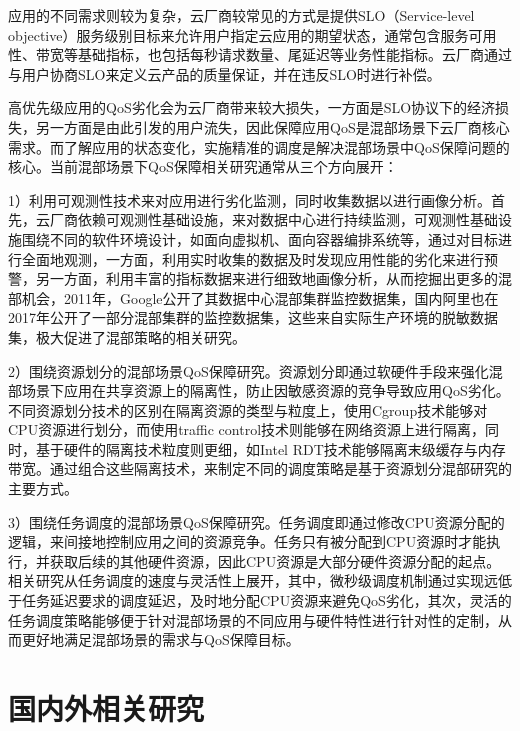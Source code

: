 应用的不同需求则较为复杂，云厂商较常见的方式是提供SLO（Service-level objective）服务级别目标来允许用户指定云应用的期望状态，通常包含服务可用性、带宽等基础指标，也包括每秒请求数量、尾延迟等业务性能指标。云厂商通过与用户协商SLO来定义云产品的质量保证，并在违反SLO时进行补偿。

高优先级应用的QoS劣化会为云厂商带来较大损失，一方面是SLO协议下的经济损失，另一方面是由此引发的用户流失，因此保障应用QoS是混部场景下云厂商核心需求。而了解应用的状态变化，实施精准的调度是解决混部场景中QoS保障问题的核心。当前混部场景下QoS保障相关研究通常从三个方向展开：

1）利用可观测性技术来对应用进行劣化监测，同时收集数据以进行画像分析。首先，云厂商依赖可观测性基础设施，来对数据中心进行持续监测，可观测性基础设施围绕不同的软件环境设计，如面向虚拟机、面向容器编排系统等，通过对目标进行全面地观测，一方面，利用实时收集的数据及时发现应用性能的劣化来进行预警，另一方面，利用丰富的指标数据来进行细致地画像分析，从而挖掘出更多的混部机会，2011年，Google公开了其数据中心混部集群监控数据集，国内阿里也在2017年公开了一部分混部集群的监控数据集\citep{guo2019limits}，这些来自实际生产环境的脱敏数据集，极大促进了混部策略的相关研究。

2）围绕资源划分的混部场景QoS保障研究。资源划分即通过软硬件手段来强化混部场景下应用在共享资源上的隔离性，防止因敏感资源的竞争导致应用QoS劣化。不同资源划分技术的区别在隔离资源的类型与粒度上，使用Cgroup技术能够对CPU资源进行划分，而使用traffic control技术\citep{hubert2002linux}则能够在网络资源上进行隔离，同时，基于硬件的隔离技术粒度则更细，如Intel RDT技术\citep{guide2011intel}能够隔离末级缓存与内存带宽。通过组合这些隔离技术，来制定不同的调度策略是基于资源划分混部研究的主要方式。

3）围绕任务调度的混部场景QoS保障研究。任务调度即通过修改CPU资源分配的逻辑，来间接地控制应用之间的资源竞争。任务只有被分配到CPU资源时才能执行，并获取后续的其他硬件资源，因此CPU资源是大部分硬件资源分配的起点。相关研究从任务调度的速度与灵活性上展开，其中，微秒级调度机制通过实现远低于任务延迟要求的调度延迟，及时地分配CPU资源来避免QoS劣化，其次，灵活的任务调度策略能够便于针对混部场景的不同应用与硬件特性进行针对性的定制，从而更好地满足混部场景的需求与QoS保障目标。

\section{国内外相关研究}


